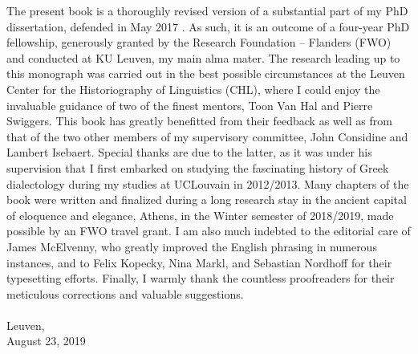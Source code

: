 \addchap{\lsAcknowledgementTitle} 
 
The present book is a thoroughly revised version of a substantial part of my PhD dissertation, defended in May 2017 \parencite{VanRooy2017}. As such, it is an outcome of a four-year PhD fellowship, generously granted by the Research Foundation – Flanders (FWO) and conducted at KU Leuven, my main alma mater. The research leading up to this monograph was carried out in the best possible circumstances at the Leuven Center for the Historiography of Linguistics (CHL), where I could enjoy the invaluable guidance of two of the finest mentors, Toon Van Hal and Pierre Swiggers. This book has greatly benefitted from their feedback as well as from that of the two other members of my supervisory committee, John Considine and Lambert Isebaert. Special thanks are due to the latter, as it was under his supervision that I first embarked on studying the fascinating history of Greek dialectology during my studies at UCLouvain in 2012/2013. Many chapters of the book were written and finalized during a long research stay in the ancient capital of eloquence and elegance, Athens, in the Winter semester of 2018/2019, made possible by an FWO travel grant. I am also much indebted to the editorial care of James McElvenny, who greatly improved the English phrasing in numerous instances, and to Felix Kopecky, Nina Markl, and Sebastian Nordhoff for their typesetting efforts. Finally, I warmly thank the countless proofreaders for their meticulous corrections and valuable suggestions.\\\\
Leuven,\\August 23, 2019
